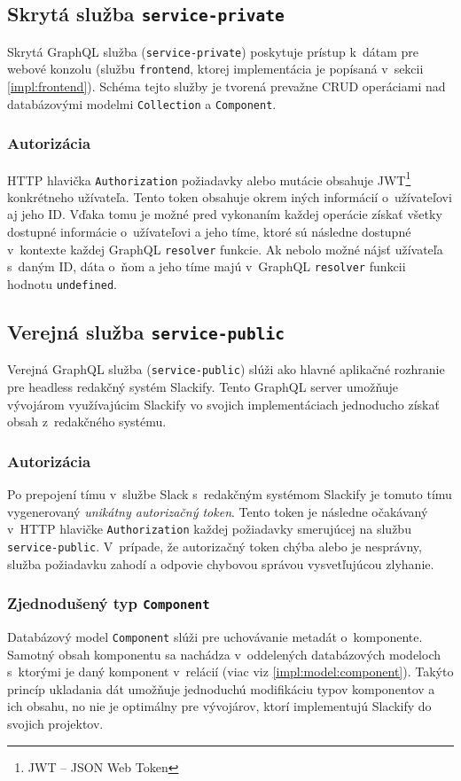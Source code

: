 \subsection{Skrytá služba \texttt{service-private}}
\label{impl:service-private}
Skrytá GraphQL služba (\texttt{service-private}) poskytuje prístup k~dátam pre webové konzolu (službu \texttt{frontend}, ktorej implementácia je popísaná v~sekcii \ref{impl:frontend}). Schéma tejto služby je tvorená prevažne CRUD operáciami nad databázovými modelmi \texttt{Collection} a \texttt{Component}.

\subsubsection{Autorizácia}
HTTP hlavička \texttt{Authorization} požiadavky alebo mutácie obsahuje JWT\footnote{JWT -- JSON Web Token} konkrétneho užívateľa. Tento token obsahuje okrem iných informácií o~užívateľovi aj jeho ID. Vďaka tomu je možné pred vykonaním každej operácie získať všetky dostupné informácie o~užívateľovi a jeho tíme, ktoré sú následne dostupné v~kontexte každej GraphQL \texttt{resolver} funkcie. Ak nebolo možné nájsť užívateľa s~daným ID, dáta o~ňom a jeho tíme majú v~GraphQL \texttt{resolver} funkcii hodnotu \texttt{undefined}.

\subsection{Verejná služba \texttt{service-public}}
\label{impl:service-public}
Verejná GraphQL služba (\texttt{service-public}) slúži ako hlavné aplikačné rozhranie pre headless redakčný systém Slackify. Tento GraphQL server umožňuje vývojárom využívajúcim Slackify vo svojich implementáciach jednoducho získať obsah z~redakčného systému.

\subsubsection{Autorizácia}
Po prepojení tímu v~službe Slack s~redakčným systémom Slackify je tomuto tímu vygenerovaný \emph{unikátny autorizačný token}. Tento token je následne očakávaný v~HTTP hlavičke \texttt{Authorization} každej požiadavky smerujúcej na službu \texttt{service-public}. V~prípade, že autorizačný token chýba alebo je nesprávny, služba požiadavku zahodí a odpovie chybovou správou vysvetľujúcou zlyhanie. 

\subsubsection{Zjednodušený typ \texttt{Component}}
Databázový model \texttt{Component} slúži pre uchovávanie metadát o~komponente. Samotný obsah komponentu sa nachádza v~oddelených databázových modeloch s~ktorými je daný komponent v~relácií (viac viz \ref{impl:model:component}). Takýto princíp ukladania dát umožňuje jednoduchú modifikáciu typov komponentov a ich obsahu, no nie je optimálny pre vývojárov, ktorí implementujú Slackify do svojich projektov. \\


